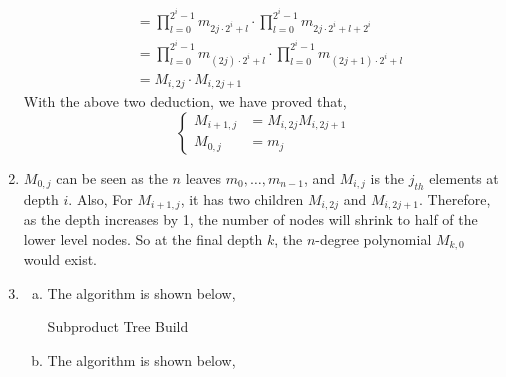 \documentclass[12pt, a4paper]{article}
\begin{document}
\begin{enumerate}
\begin{align*}
                         &= \prod_{l=0}^{2^i-1}m_{2j\cdot 2^i+l}\cdot \prod_{l=0}^{2^i-1}m_{2j\cdot 2^i + l + 2^i}\\
                         &= \prod_{l=0}^{2^i-1}m_{(2j)\cdot 2^i+l}\cdot \prod_{l=0}^{2^i-1}m_{(2j+1)\cdot 2^i + l}\\
                         &= M_{i, 2j}\cdot M_{i, 2j+1}
          \end{align*}
          With the above two deduction, we have proved that,
          \[
          \begin{cases}
              M_{i+1, j} &= M_{i, 2j}M_{i, 2j+1}\\
              M_{0, j}   &= m_j
          \end{cases}
          \]
    \item $M_{0, j}$ can be seen as the $n$ leaves $m_0,\dots,m_{n-1}$, and $M_{i, j}$ is the $j_{th}$ elements at depth $i$. 
          Also, For $M_{i+1, j}$, it has two children $M_{i, 2j}$ and $M_{i, 2j+1}$. Therefore, as the depth increases by 1, 
          the number of nodes will shrink to half of the lower level nodes. So at the final depth $k$, 
          the $n$-degree polynomial $M_{k, 0}$ would exist.
    \item \begin{enumerate}[a)]
        \item The algorithm is shown below,
              
              \begin{algorithm}[!htb]
                  \caption{Subproduct Tree Build}
                  \BlankLine
                  \;
              \end{algorithm}
        \item The algorithm is shown below,
              

\end{enumerate}
\end{enumerate}
\end{document}
